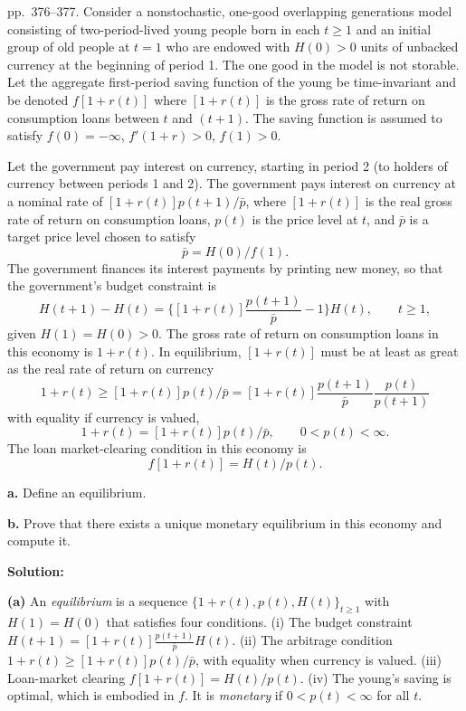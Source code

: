 \documentclass[12pt, letterpaper]{article}
\begin{document}
\begin{tcolorbox}[evenbox,title={Exercise 9.12 \quad Grandmont--Hall}]
\begin{tcolorbox}[questionbox]
pp.~376--377. Consider a nonstochastic, one-good overlapping generations model consisting of
two-period-lived young people born in each $t\ge1$ and an initial group of old people at $t=1$ who
are endowed with $H(0)>0$ units of unbacked currency at the beginning of period 1. The one good in
the model is not storable. Let the aggregate first-period saving function of the young be
time-invariant and be denoted $f[1+r(t)]$ where $[1+r(t)]$ is the gross rate of return on
consumption loans between $t$ and $(t+1)$. The saving function is assumed to satisfy
$f(0)=-\infty$, $f'(1+r)>0$, $f(1)>0$.

Let the government pay interest on currency, starting in period 2 (to holders of currency between
periods 1 and 2). The government pays interest on currency at a nominal rate of
$[1+r(t)]p(t+1)/\bar p$, where $[1+r(t)]$ is the real gross rate of return on consumption loans,
$p(t)$ is the price level at $t$, and $\bar p$ is a target price level chosen to satisfy
\[
\bar p=H(0)/f(1).
\]
The government finances its interest payments by printing new money, so that the government's budget
constraint is
\[
H(t+1)-H(t)=\Big\{[1+r(t)]\frac{p(t+1)}{\bar p}-1\Big\}H(t),\qquad t\ge1,
\]
given $H(1)=H(0)>0$. The gross rate of return on consumption loans in this economy is $1+r(t)$. In
equilibrium, $[1+r(t)]$ must be at least as great as the real rate of return on currency
\[
1+r(t)\ge[1+r(t)]p(t)/\bar p=[1+r(t)]\frac{p(t+1)}{\bar p}\frac{p(t)}{p(t+1)}
\]
with equality if currency is valued,
\[
1+r(t)=[1+r(t)]p(t)/\bar p,\qquad 0<p(t)<\infty.
\]
The loan market-clearing condition in this economy is
\[
f[1+r(t)]=H(t)/p(t).
\]

\textbf{a.} Define an equilibrium.

\textbf{b.} Prove that there exists a unique monetary equilibrium in this economy and compute it.
\end{tcolorbox}

\textbf{Solution:}

\textbf{(a)} An \emph{equilibrium} is a sequence $\{1+r(t),p(t),H(t)\}_{t\ge1}$ with $H(1)=H(0)$ that
satisfies four conditions. (i) The budget constraint
$H(t+1)=[1+r(t)]\frac{p(t+1)}{\bar p}H(t)$. (ii) The arbitrage condition
$1+r(t)\ge[1+r(t)]p(t)/\bar p$, with equality when currency is valued. (iii) Loan-market clearing
$f[1+r(t)]=H(t)/p(t)$. (iv) The young's saving is optimal, which is embodied in $f$. It is
\emph{monetary} if $0<p(t)<\infty$ for all $t$.


\end{tcolorbox}
\end{document}
